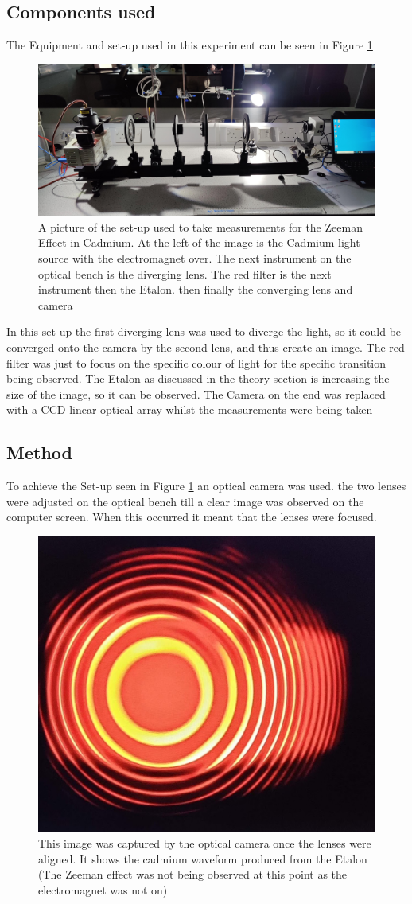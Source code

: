 \documentclass[a4paper,11pt]{article}
\begin{document}
\subsection{Components used}
The Equipment and set-up used in this experiment can be seen in Figure \ref{fig:Experimental Set-up}
\begin{figure}[htb!]
    \centering
    \includegraphics[width=0.9\columnwidth]{Images/Cadmium Zeeman Set-up 3.jpg}
    \caption{A picture of the set-up used to take measurements for the Zeeman Effect in Cadmium. At the left of the image is the Cadmium light source with the electromagnet over. The next instrument on the optical bench is the diverging lens. The red filter is the next instrument then the Etalon. then finally the converging lens and camera}
    \label{fig:Experimental Set-up}
\end{figure}

In this set up the first diverging lens was used to diverge the light, so it could be converged onto the camera by the second lens, and thus create an image. The red filter was just to focus on the specific colour of light for the specific transition being observed. The Etalon as discussed in the theory section is increasing the size of the image, so it can be observed. The Camera on the end was replaced with a CCD linear optical array whilst the measurements were being taken


\subsection{Method}
To achieve the Set-up seen in Figure \ref{fig:Experimental Set-up} an optical camera was used. the two lenses were adjusted on the optical bench till a clear image was observed on the computer screen. When this occurred it meant that the lenses were focused.
\begin{figure}[hbt!]
    \centering
    \includegraphics[width=0.2\columnwidth]{Images/Waveform Pic.jpg}
    \caption{This image was captured by the optical camera once the lenses were aligned. It shows the cadmium waveform produced from the Etalon (The Zeeman effect was not being observed at this point as the electromagnet was not on)}
    \label{fig:Picture of the image}
\end{figure}
\end{document}

